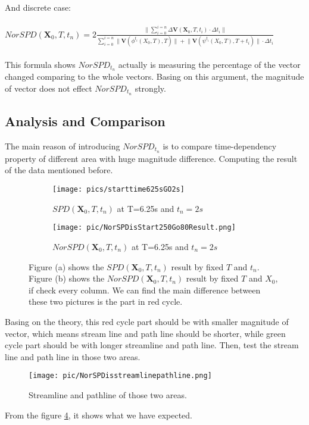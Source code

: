 \documentclass[
     11pt,         %
     a4paper,      %
     oneside,
     ]{article}
\newcommand{\vect}[1]{\boldsymbol{#1}}
\begin{document}
	 \\
	 And discrete case:\\
	 \\
	 $NorSPD(\vect{X}_{0},T,t_{n})=2\frac{\lVert\sum_{i=0}^{i=n}\Delta\vect{V}(\vect{X}_{0},T,t_{i})\cdot\Delta t_{i}\rVert}{\sum_{i=0}^{i=n}\lVert\vect{V}(\phi^{t_{i}}(X_{0},T),T)\rVert+\lVert\vect{V}(\psi^{t_{i}}(X_{0},T),T+t_{i})\rVert \cdot \Delta t_{i}}$\\
	 \\
	 This formula shows $NorSPD_{t_{n}}$ actually is measuring the percentage of the vector changed comparing to the whole vectors.  Basing on this argument, the magnitude of vector does not effect $NorSPD_{t_{n}}$ strongly.\\
	 
	 \subsection{Analysis and Comparison}
	 The main reason of introducing $NorSPD_{t_{n}}$ is to compare time-dependency property of different area with huge magnitude difference. Computing the result  of the data mentioned before.\\
	 \begin{figure}[H]
	   	\begin{subfigure}{0.5\textwidth}
	  	    \centering
	  	    \texttt{[image: pics/starttime625sGO2s]}
	        \caption{$SPD(\vect{X}_{0},T,t_{n})$ at T=6.25s and  $t_{n}=2s$}
	  	    \label{fig:SPDisResult}
	    \end{subfigure}
	    \begin{subfigure}{0.5\textwidth}
	    	\centering
	    	\texttt{[image: pic/NorSPDisStart250Go80Result.png]}
	    	\caption{$NorSPD(\vect{X}_{0},T,t_{n})$ at T=6.25s and  $t_{n}=2s$}
	    	\label{fig:NorSPDisResult}
	    \end{subfigure}
	    	\caption{ Figure (a) shows the $SPD(\vect{X}_{0},T,t_{n})$ result by fixed $T$ and $t_{n}$. Figure (b) shows the $NorSPD(\vect{X}_{0},T,t_{n})$ result by fixed $T$ and $X_{0}$, if check every column. We can find the main difference between these two pictures is the part in red cycle. }
	    	\label{fig:SPDandNorSPDResult}
	 \end{figure} 
	 Basing on the theory, this red cycle part should be with smaller magnitude of vector, which means stream line and path line should be shorter, while green cycle part should be with longer streamline and path line. Then, test the stream line and path line in those two areas.\\
	 \begin{figure}[H]
	 	\centering
	 	\texttt{[image: pic/NorSPDisstreamlinepathline.png]}
	 	\caption{Streamline and pathline of those two areas.}
	 	\label{fig:NorSPDisstreamlinepathline}
	 \end{figure}
	 From the figure \ref{fig:NorSPDisstreamlinepathline}, it shows what we have expected.
\end{document}
